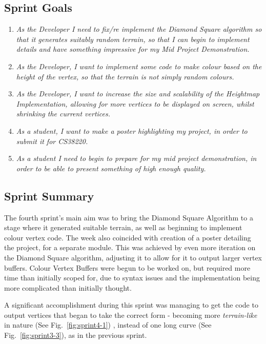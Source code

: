 \documentclass[a4paper,10pt]{report}
\begin{document}
\subsection{Sprint Goals}
\begin{enumerate}
    \item \textit{As the Developer I need to fix/re implement the Diamond Square algorithm so that it generates suitably random terrain, so that I can begin to implement details and have something impressive for my Mid Project Demonstration. }
    \item \textit{As the Developer, I want to implement some code to make colour based on the height of the vertex, so that the terrain is not simply random colours.}
    \item \textit{As the Developer, I want to increase the size and scalability of the Heightmap Implementation, allowing for more vertices to be displayed on screen, whilst shrinking the current vertices. }
    \item \textit{As a student, I want to make a poster highlighting my project, in order to submit it for CS38220.}
    \item \textit{As a student I need to begin to prepare for my mid project demonstration, in order to be able to present something of high enough quality. }
    
\end{enumerate}
\subsection{Sprint Summary}

The fourth sprint's main aim was to bring the Diamond Square Algorithm to a stage where it generated suitable terrain, as well as beginning to implement colour vertex code. The week also coincided with creation of a poster detailing the project, for a separate module. This was achieved by even more iteration on the Diamond Square algorithm, adjusting it to allow for it to output larger vertex buffers. Colour Vertex Buffers were begun to be worked on, but required more time than initially scoped for, due to syntax issues and the implementation being more complicated than initially thought.  \medskip

A significant accomplishment during this sprint was managing to get the code to output vertices that began to take the correct form - becoming more \textit{terrain-like} in nature (See Fig.~\ref{fig:sprint4-1}) , instead of one long curve (See Fig.~\ref{fig:sprint3-3}), as in the previous sprint. 
\end{document}
